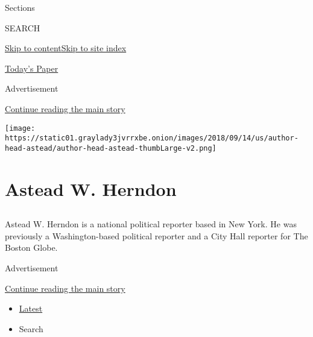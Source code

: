 Sections

SEARCH

\protect\hyperlink{site-content}{Skip to
content}\protect\hyperlink{site-index}{Skip to site index}

\href{https://myaccount.nytimes3xbfgragh.onion/auth/login?response_type=cookie\&client_id=vi}{}

\href{https://www.nytimes3xbfgragh.onion/section/todayspaper}{Today's
Paper}

Advertisement

\protect\hyperlink{after-top}{Continue reading the main story}

\texttt{[image: https://static01.graylady3jvrrxbe.onion/images/2018/09/14/us/author-head-astead/author-head-astead-thumbLarge-v2.png]}

\hypertarget{astead-w-herndon}{%
\section{Astead W. Herndon}\label{astead-w-herndon}}

\hypertarget{section}{%
\subsection{}\label{section}}

Astead W. Herndon is a national political reporter based in New York. He
was previously a Washington-based political reporter and a City Hall
reporter for The Boston Globe.

Advertisement

\protect\hyperlink{after-mid1}{Continue reading the main story}

\begin{itemize}
\tightlist
\item
  \protect\hyperlink{stream-panel}{Latest}
\item
  Search
\end{itemize}


